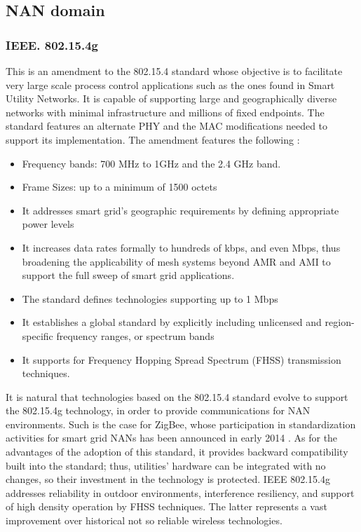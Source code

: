 \documentclass[10pt,twocolumn,twoside,submit]{JCNtran}
\begin{document}
\subsection{NAN domain}

\subsubsection{IEEE. 802.15.4g}\label{tech::802154g}

This is an amendment to the 802.15.4 standard whose objective is to facilitate very large scale process control applications such as the ones found in Smart Utility Networks. It is capable of supporting large and geographically diverse networks with minimal infrastructure and millions of fixed endpoints. The standard features an alternate PHY and the MAC modifications needed to support its implementation. The amendment features the following \cite{Shin2010}:

\begin{itemize}

	\item Frequency bands: 700 MHz to 1GHz and the 2.4 GHz band.
	\item Frame Sizes: up to a minimum of 1500 octets
	\item It addresses smart grid's geographic requirements by defining appropriate power levels
	\item It increases data rates formally to hundreds of kbps, and even Mbps, thus broadening the applicability of mesh systems beyond AMR and AMI to support the full sweep of smart grid applications. 
	\item The standard defines technologies supporting up to 1 Mbps
	\item It establishes a global standard by explicitly including unlicensed and region-specific frequency ranges, or spectrum bands
	\item It supports for Frequency Hopping Spread Spectrum (FHSS) transmission techniques.

\end{itemize}

It is natural that technologies based on the 802.15.4 standard evolve to support the 802.15.4g technology, in order to provide communications for NAN environments. Such is the case for ZigBee, whose participation in standardization activities for smart grid NANs has been announced in early 2014 \cite{Alliance2014}. As for the advantages of the adoption of this standard, it provides backward compatibility built into the standard; thus, utilities' hardware can be integrated with no changes, so their investment in the technology is protected. IEEE 802.15.4g addresses reliability in outdoor environments, interference resiliency, and support of high density operation by FHSS techniques. The latter represents a vast improvement over historical not so reliable wireless technologies.
\end{document}
